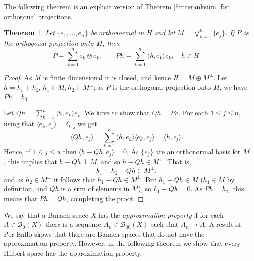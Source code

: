 \documentclass{article}
\newcommand{\inner}[2]{\langle #1, #2 \rangle}
\newtheorem{theorem}{Theorem}
\begin{document}
The following theorem is an explicit version of Theorem \ref{finiteranksum} for orthogonal projections.

\begin{theorem}
Let $\{e_1,\ldots,e_n\}$ be orthonormal in $H$ and let $M=\bigvee_{k=1}^n \{e_j\}$. If $P$ is the orthogonal projection onto $M$, then
\[
P = \sum_{k=1}^n e_k \otimes e_k, \qquad Ph = \sum_{k=1}^n \inner{h}{e_k} e_k, \quad h \in H.
\]
\label{projectionsum}
\end{theorem}
\begin{proof}
 As $M$ is finite dimensional it is closed, and hence $H=M \oplus M^\perp$. Let $h = h_1 + h_2$, $h_1 \in M, h_2 \in M^\perp$; as
 $P$ is the orthogonal projection onto $M$, we have $Ph=h_1$.

Let $Qh = \sum_{k=1}^n \inner{h}{e_k}e_k$. We have to show that $Qh =Ph$. For each $1 \leq  j \leq n$, using that $\inner{e_k}{e_j}=\delta_{k,j}$ we get
\[
\inner{Qh}{e_j} = \sum_{k=1}^n \inner{h}{e_k}\inner{e_k}{e_j} = \inner{h}{e_j}. 
\]
Hence, if $1 \leq j \leq n$ then $\inner{h-Qh}{e_j}=0$. As $\{e_j\}$ are an orthonormal basis for $M$, this implies that
$h-Qh \perp M$, and so $h-Qh \in M^\perp$. That is,
\[
h_1+h_2-Qh \in M^\perp,
\]
and as $h_2 \in M^\perp$ it follows that $h_1 - Qh \in M^\perp$. But $h_1-Qh \in M$ ($h_1 \in M$ by definition, and $Qh$ is a sum of elements
in $M$), so $h_1-Qh=0$. As $Ph=h_1$, this means that $Ph=Qh$, completing the proof.
\end{proof}



We say that a Banach space $X$ has the {\em approximation property} if for each $A \in \mathscr{B}_0(X)$ there is a sequence $A_n \in \mathscr{B}_{00}(X)$ such that
$A_n \to A$. A result of Per Enflo shows that there are Banach spaces that do not have the approximation property. However, in the following theorem we show that
every Hilbert space has the approximation property.
\end{document}
